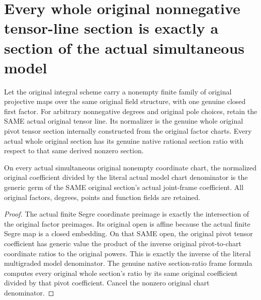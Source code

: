\section{Every whole original nonnegative tensor-line section is exactly a section of the actual simultaneous model}
\begin{definition}\label{def:original-whole-tensor-normalized-coefficient}
\leanok
{}
Let the original integral scheme carry a nonempty finite family of original projective maps over the same original field structure, with one genuine closed first factor. For arbitrary nonnegative degrees and original pole choices, retain the SAME actual original tensor line. Its normalizer is the genuine whole original pivot tensor section internally constructed from the original factor charts. Every actual whole original section has its genuine native rational section ratio with respect to that same derived nonzero section.
\end{definition}
\begin{theorem}\label{thm:original-whole-tensor-chart-fractions}
\leanok
{}
On every actual simultaneous original nonempty coordinate chart, the normalized original coefficient divided by the literal actual model chart denominator is the generic germ of the SAME original section's actual joint-frame coefficient. All original factors, degrees, points and function fields are retained.
\end{theorem}
\begin{proof}
The actual finite Segre coordinate preimage is exactly the intersection of the original factor preimages. Its original open is affine because the actual finite Segre map is a closed embedding. On that SAME open, the original pivot tensor coefficient has generic value the product of the inverse original pivot-to-chart coordinate ratios to the original powers. This is exactly the inverse of the literal multigraded model denominator. The genuine native section-ratio frame formula computes every original whole section's ratio by its same original coefficient divided by that pivot coefficient. Cancel the nonzero original chart denominator.
\end{proof}
